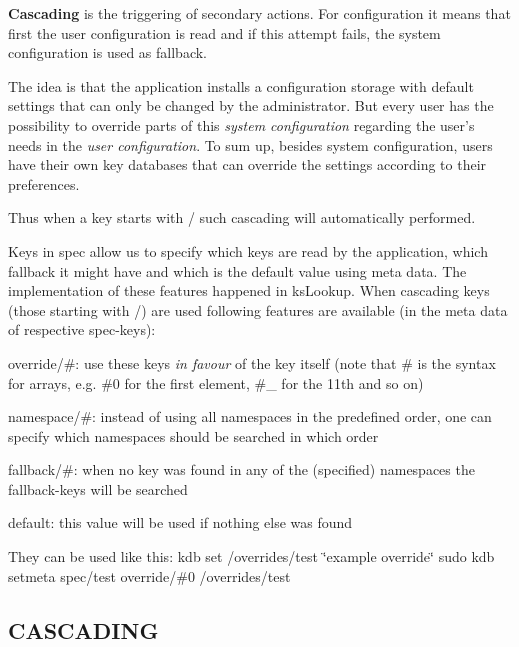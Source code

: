 {\bfseries Cascading} is the triggering of secondary actions. For configuration it means that first the user configuration is read and if this attempt fails, the system configuration is used as fallback.

The idea is that the application installs a configuration storage with default settings that can only be changed by the administrator. But every user has the possibility to override parts of this {\itshape system configuration} regarding the user's needs in the {\itshape user configuration}. To sum up, besides system configuration, users have their own key databases that can override the settings according to their preferences.

Thus when a key starts with {\ttfamily /} such cascading will automatically performed.

Keys in {\ttfamily spec} allow us to specify which keys are read by the application, which fallback it might have and which is the default value using meta data. The implementation of these features happened in {\ttfamily ks\+Lookup}. When cascading keys (those starting with {\ttfamily /}) are used following features are available (in the meta data of respective {\ttfamily spec}-\/keys)\+:


\begin{DoxyItemize}
\item {\ttfamily override/\#}\+: use these keys {\itshape in favour} of the key itself (note that {\ttfamily \#} is the syntax for arrays, e.\+g. {\ttfamily \#0} for the first element, {\ttfamily \#\+\_} for the 11th and so on)
\item {\ttfamily namespace/\#}\+: instead of using all namespaces in the predefined order, one can specify which namespaces should be searched in which order
\item {\ttfamily fallback/\#}\+: when no key was found in any of the (specified) namespaces the {\ttfamily fallback}-\/keys will be searched
\item {\ttfamily default}\+: this value will be used if nothing else was found
\end{DoxyItemize}

They can be used like this\+: {\ttfamily kdb set /overrides/test \char`\"{}example override\char`\"{}} {\ttfamily sudo kdb setmeta spec/test override/\#0 /overrides/test}

\subsection*{C\+A\+S\+C\+A\+D\+I\+N\+G}

